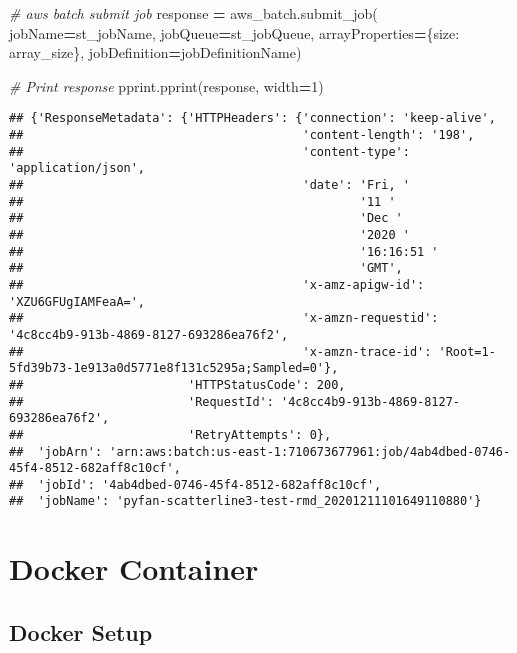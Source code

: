 \documentclass[
]{book}
\newenvironment{Shaded}{\begin{snugshade}}{\end{snugshade}}
\newcommand{\CommentTok}[1]{\textcolor[rgb]{0.56,0.35,0.01}{\textit{#1}}}
\newcommand{\DecValTok}[1]{\textcolor[rgb]{0.00,0.00,0.81}{#1}}
\newcommand{\NormalTok}[1]{#1}
\newcommand{\OperatorTok}[1]{\textcolor[rgb]{0.81,0.36,0.00}{\textbf{#1}}}
\newcommand{\StringTok}[1]{\textcolor[rgb]{0.31,0.60,0.02}{#1}}
\begin{document}
\begin{Shaded}
\begin{Highlighting}[]
\CommentTok{\# aws batch submit job}
\NormalTok{response }\OperatorTok{=}\NormalTok{ aws\_batch.submit\_job(}
\NormalTok{    jobName}\OperatorTok{=}\NormalTok{st\_jobName,}
\NormalTok{    jobQueue}\OperatorTok{=}\NormalTok{st\_jobQueue,}
\NormalTok{    arrayProperties}\OperatorTok{=}\NormalTok{\{}\StringTok{\textquotesingle{}size\textquotesingle{}}\NormalTok{: array\_size\},}
\NormalTok{    jobDefinition}\OperatorTok{=}\NormalTok{jobDefinitionName)}
    
\CommentTok{\# Print response}
\NormalTok{pprint.pprint(response, width}\OperatorTok{=}\DecValTok{1}\NormalTok{)}
\end{Highlighting}
\end{Shaded}

\begin{verbatim}
## {'ResponseMetadata': {'HTTPHeaders': {'connection': 'keep-alive',
##                                       'content-length': '198',
##                                       'content-type': 'application/json',
##                                       'date': 'Fri, '
##                                               '11 '
##                                               'Dec '
##                                               '2020 '
##                                               '16:16:51 '
##                                               'GMT',
##                                       'x-amz-apigw-id': 'XZU6GFUgIAMFeaA=',
##                                       'x-amzn-requestid': '4c8cc4b9-913b-4869-8127-693286ea76f2',
##                                       'x-amzn-trace-id': 'Root=1-5fd39b73-1e913a0d5771e8f131c5295a;Sampled=0'},
##                       'HTTPStatusCode': 200,
##                       'RequestId': '4c8cc4b9-913b-4869-8127-693286ea76f2',
##                       'RetryAttempts': 0},
##  'jobArn': 'arn:aws:batch:us-east-1:710673677961:job/4ab4dbed-0746-45f4-8512-682aff8c10cf',
##  'jobId': '4ab4dbed-0746-45f4-8512-682aff8c10cf',
##  'jobName': 'pyfan-scatterline3-test-rmd_20201211101649110880'}
\end{verbatim}

\hypertarget{docker-container}{%
\chapter{Docker Container}\label{docker-container}}

\hypertarget{docker-setup}{%
\section{Docker Setup}\label{docker-setup}}
\end{document}
